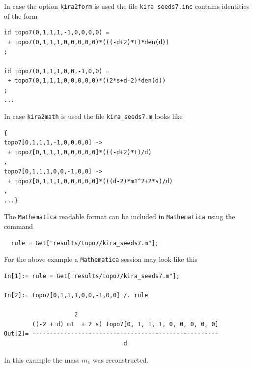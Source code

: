 \documentclass[a4paper,12pt]{scrartcl}
\newcommand*{\mathematica}{\texttt{Mathematica}}
\begin{document}
In case the option \texttt{kira2form} is used the file
\texttt{kira\_seeds7.inc} contains identities of the form
\begin{verbatim}
id topo7(0,1,1,1,-1,0,0,0,0) =
 + topo7(0,1,1,1,0,0,0,0,0)*(((-d+2)*t)*den(d))
;

id topo7(0,1,1,1,0,0,-1,0,0) =
 + topo7(0,1,1,1,0,0,0,0,0)*((2*s+d-2)*den(d))
;
...
\end{verbatim}
In case \texttt{kira2math} is used the file
\texttt{kira\_seeds7.m} looks like
\begin{verbatim}
{
topo7[0,1,1,1,-1,0,0,0,0] ->
 + topo7[0,1,1,1,0,0,0,0,0]*(((-d+2)*t)/d)
,
topo7[0,1,1,1,0,0,-1,0,0] ->
 + topo7[0,1,1,1,0,0,0,0,0]*(((d-2)*m1^2+2*s)/d)
,
...}
\end{verbatim}
The \mathematica{} readable format can be included in \mathematica{} using
the command
\begin{verbatim}
  rule = Get["results/topo7/kira_seeds7.m"];
\end{verbatim}
For the above example a \mathematica{} session may look like this
\begin{verbatim}
In[1]:= rule = Get["results/topo7/kira_seeds7.m"];

In[2]:= topo7[0,1,1,1,0,0,-1,0,0] /. rule

                    2
        ((-2 + d) m1  + 2 s) topo7[0, 1, 1, 1, 0, 0, 0, 0, 0]
Out[2]= -----------------------------------------------------
                                  d
\end{verbatim}
In this example the mass $m_{1}$ was reconstructed.
\end{document}

